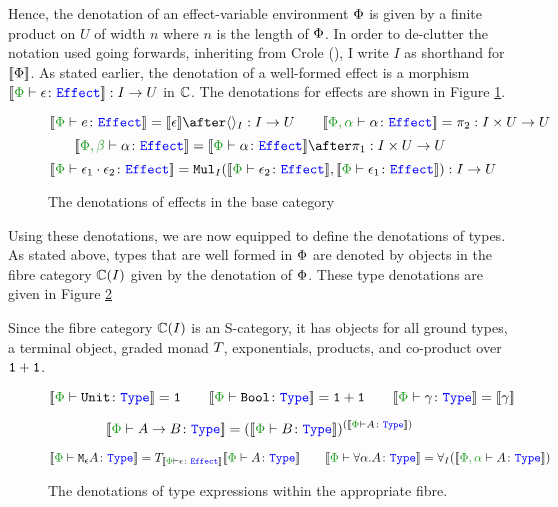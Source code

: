 \documentclass{Report}
\begin{document}
Hence, the denotation of an  effect-variable environment $\P$ is given by a finite product on $U$ of width $n$ where $n$ is the length of $\P$. In order to de-clutter the notation used going forwards, inheriting from Crole (\cite{crole_1994}), I write $I$ as shorthand for $\deno{\P}$. As stated earlier, the denotation of a well-formed effect is a morphism $\deno{\typerelation{\P}{\e}{\effect}}: I \rightarrow U$ in $\C$. The denotations for effects are shown in Figure \ref{EffectDenotations}.
\begin{figure}[H]
    \centering
    \begin{framed}
        \[
    \deno{\typerelation{\P}{e}{\effect}} = \deno{\e} \after \term{I}: I\rightarrow U
    \quad\quad
    \deno{\typerelation{\P,\a}{\a}{\effect}} = \pp: I\times U \rightarrow U
\]\[
    \deno{\typerelation{\P, \b}{\a}{\effect}} = \deno{\typerelation{\P}{\a}{\effect}}\after\p: I\times U\rightarrow U
\]\[
    \deno{\typerelation{\P}{\e_1\dot \e_2}{\effect}} = \Mul_I(\deno{\typerelation{\P}{\e_2}{\effect}},\deno{\typerelation{\P}{\e_1}{\effect}}): I \rightarrow U
\]
    \end{framed}
    \caption{The denotations of effects in the base category}
    \label{EffectDenotations}
\end{figure}


Using these denotations, we are now equipped to define the denotations of types. As stated above, types that are well formed in $\P$ are denoted by objects in the fibre category $\C(I)$ given by the denotation of $\P$. These type denotations are given in Figure \ref{TypeDenotations}
 
Since the fibre category $\C(I)$ is an S-category, it has objects for all ground types, a terminal object, graded monad $\T{}{}$, exponentials, products, and co-product over $\1+\1$.

\begin{figure}[H]
    \centering
    \begin{framed}
\[
    \deno{\typerelation{\P}{\U}{\type}} = \1
    \quad\quad
    \deno{\typerelation{\P}{\B}{\type}} = \1+\1
    \quad\quad
    \deno{\typerelation{\P}{\g}{\type}} = \deno{\g}
\] 

\[
    \deno{\typerelation{\P}{\ab}{\type}} = (\deno{\typerelation{\P}{B}{\type}})^{(\deno{\typerelation{\P}{A}{\type}})}
\]

\[
    \deno{\typerelation{\P}{\mea}{\type}} =\T{\deno{\typerelation{\P}{\e}{\effect}}}{\deno{\typerelation{\P}{A}{\type}}}
    \quad\quad
    \deno{\typerelation{\P}{\all{\a}{A}}{\type}} =\allI(\deno{\typerelation{\P,\a}{A}{\type}})
\]


    \end{framed}
    \caption{The denotations of type expressions within the appropriate fibre.}
    \label{TypeDenotations}
\end{figure}
\end{document}
